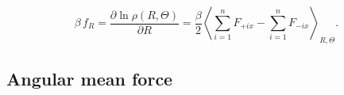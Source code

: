 \documentclass{article}
\begin{document}
%
$$
\beta \, f_{R}
=
\frac{ \partial \ln \rho(R, \Theta) }
     { \partial R }
=
\frac \beta 2
\left\langle
  \sum_{i = 1}^n F_{+ix}
  -
  \sum_{i = 1}^n F_{-ix}
\right\rangle_{R, \Theta}
.
$$


\subsection{Angular mean force}
\end{document}
